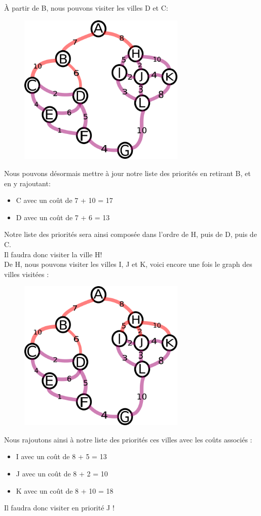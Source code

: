 \documentclass[a4paper, 12pt]{article}
\numberwithin{equation}{subsection}
\begin{document}
À partir de B, nous pouvons visiter les villes D et C:
\begin{figure}[H]
  \centering
  \includegraphics[width=8.0cm]{imgs/third_search.png}
\end{figure}
Nous pouvons désormais mettre à jour notre liste des priorités en retirant B, et en y rajoutant: \\
\begin{itemize}
  \item C avec un coût de 7 + 10 = 17
  \item D avec un coût de 7 + 6 = 13
\end{itemize}
Notre liste des priorités sera ainsi composée dans l'ordre de H, puis de D, puis de C. \\

Il faudra donc visiter la ville H! \\

De H, nous pouvons visiter les villes I, J et K, voici encore une fois le graph des villes visitées : \\
\begin{figure}[H]
  \centering
  \includegraphics[width=8.0cm]{imgs/fourth_search.png}
\end{figure}
Nous rajoutons ainsi à notre liste des priorités ces villes avec les coûts associés : \\
\begin{itemize}
  \item I avec un coût de 8 + 5 = 13
  \item J avec un coût de 8 + 2 = 10
  \item K avec un coût de 8 + 10 = 18
\end{itemize}
Il faudra donc visiter en priorité J ! \\
\end{document}
